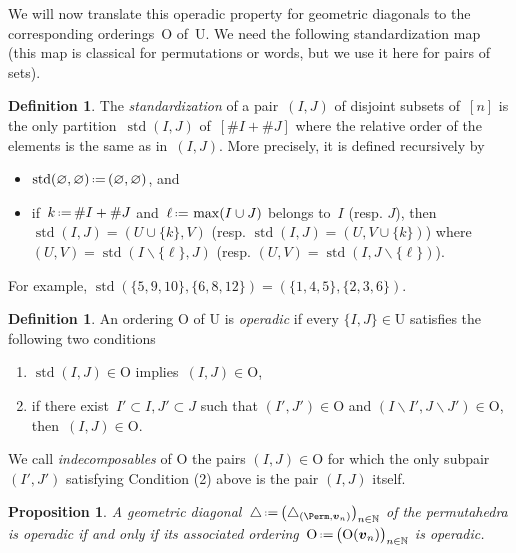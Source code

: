 \documentclass{amsart}
\newcommand{\darkblue}{\color{darkblue}} %
\newtheorem{proposition}[theorem]{Proposition}
\theoremstyle{definition}
\newtheorem{definition}[theorem]{Definition}
\newcommand{\N}{\mathbb{N}} %
\renewcommand{\b}[1]{{\boldsymbol{#1}}} %
\newcommand{\Un}{\mathrm{U}} %
\newcommand{\Or}{\mathrm{O}} %
\newcommand{\ssm}{\smallsetminus} %
\newcommand{\eqdef}{\mbox{\,\raisebox{0.2ex}{\scriptsize\ensuremath{\mathrm:}}\ensuremath{=}\,}} %
\newcommand{\card}[1]{\##1} %
\DeclareMathOperator{\std}{std}
\newcommand{\defn}[1]{\textsl{\darkblue #1}} %
\renewcommand{\b}[1]{\boldsymbol{#1}} %
\begin{document}
We will now translate this operadic property for geometric diagonals to the corresponding orderings~$\Or$ of~$\Un$.
We need the following standardization map (this map is classical for permutations or words, but we use it here for pairs of sets).

\begin{definition}
The \defn{standardization} of a pair~$(I,J)$ of disjoint subsets of~$[n]$ is the only partition~$\std(I,J)$ of~$[\card{I}+\card{J}]$ where the relative order of the elements is the same as in~$(I,J)$.
More precisely, it is defined recursively by
\begin{itemize}
\item $\std(\varnothing, \varnothing) \eqdef (\varnothing, \varnothing)$, and
\item if~$k \eqdef \card{I}+\card{J}$ and~$\ell \eqdef \max(I \cup J)$ belongs to~$I$ (resp. $J$), then~$\std(I,J) = (U \cup \{k\}, V)$ (resp. $\std(I,J) \! = \! (U, V \cup \{k\})$) where~$(U,V) \! = \! \std(I \ssm \{\ell\}, J)$ (resp. ${(U,V) \! = \! \std(I, J \ssm \{\ell\})}$).
\end{itemize}
\end{definition}

For example, $\std(\{5,9,10\},\{6,8,12\}) = (\{1,4,5\},\{2,3,6\})$.

\begin{definition}
\label{def:operadicOrdering}
An ordering $\Or$ of $\Un$ is \defn{operadic} if every $\{I,J\} \in \Un$ satisfies the following two conditions
\begin{enumerate}
\item $\std(I,J) \in \Or$ implies~$(I,J) \in \Or$,
\item if there exist~$I'\subset I, J'\subset J$ such that $(I',J') \in \Or$ and $(I\ssm I',J\ssm J') \in \Or$, then~$(I,J) \in \Or$.
\end{enumerate}
We call \defn{indecomposables} of $\Or$ the pairs $(I,J) \in \Or$ for which the only subpair $(I',J')$ satisfying Condition (2) above is the pair $(I,J)$ itself.
\end{definition}

\begin{proposition}
\label{prop:equiv-operadic}
A geometric diagonal~$\triangle \eqdef \bigl( \triangle_{(\Perm, \b{v}_n)} \bigr)_{n \in \N}$ of the permutahedra is operadic if and only if its associated ordering~$\Or \eqdef \bigl( \Or(\b{v}_n) \bigr)_{n \in \N}$ is operadic. 
\end{proposition}
\end{document}
